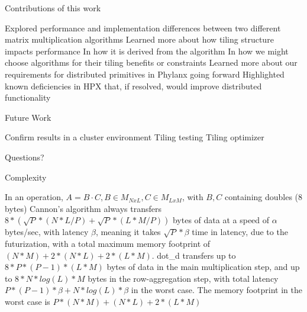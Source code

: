 \documentclass[10pt]{beamer}
\begin{document}
\begin{frame}{Contributions of this work}
	\begin{outline}
		\1 Explored performance and implementation differences between two different matrix multiplication algorithms
		\1 Learned more about how tiling structure impacts performance
			\2 In how it is derived from the algorithm
			\2 In how we might choose algorithms for their tiling benefits or constraints
		\1 Learned more about our requirements for distributed primitives in Phylanx going forward
		\1 Highlighted known deficiencies in HPX that, if resolved, would improve distributed functionality
				
	\end{outline}
\end{frame}

\begin{frame}{Future Work}
	\begin{outline}
		\1 Confirm results in a cluster environment
		\1 Tiling testing
		\1 Tiling optimizer
	\end{outline}
\end{frame}

\begin{frame}[standout]
	Questions?
\end{frame}

\begin{frame}{Complexity}
	\begin{outline}
		\1 In an operation, $A = B \cdot C, B \in M_{NxL}, C \in M_{LxM}$, with $B, C$ containing doubles (8 bytes)
		\1 Cannon’s algorithm always transfers $8*(\sqrt{P}*(N*L/P)+\sqrt{P}*(L*M/P))$ bytes of data at a speed of $\alpha$ bytes/sec, with latency $\beta$, meaning it takes $\sqrt{P}*\beta$ time in latency, due to the futurization, with a total maximum memory footprint of $(N*M)+2*(N*L)+2*(L*M)$.
		\1 dot\_d transfers up to $8*P*(P-1)*(L*M)$ bytes of data in the main multiplication step, and up to $8*N*log(L)*M$ bytes in the row-aggregation step, with total latency $P*(P-1)*\beta+N*log(L)*\beta$ in the worst case. The memory footprint in the worst case is $P*(N*M)+(N*L)+2*(L*M)$
		
	\end{outline}
\end{frame}
\end{document}
